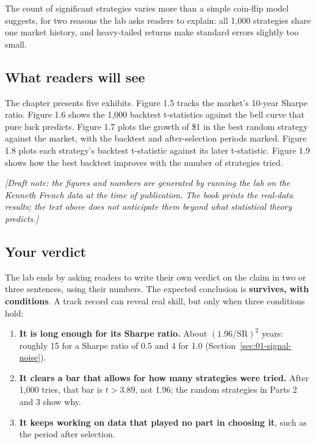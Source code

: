 The count of significant strategies varies more than a simple coin-flip model suggests, for two reasons the lab asks readers to explain: all 1,000 strategies share one market history, and heavy-tailed returns make standard errors slightly too small.

\subsection*{What readers will see}

The chapter presents five exhibits. Figure 1.5 tracks the market's 10-year Sharpe ratio. Figure 1.6 shows the 1,000 backtest t-statistics against the bell curve that pure luck predicts. Figure 1.7 plots the growth of \$1 in the best random strategy against the market, with the backtest and after-selection periods marked. Figure 1.8 plots each strategy's backtest t-statistic against its later t-statistic. Figure 1.9 shows how the best backtest improves with the number of strategies tried.

\emph{[Draft note: the figures and numbers are generated by running the lab on the Kenneth French data at the time of publication. The book prints the real-data results; the text above does not anticipate them beyond what statistical theory predicts.]}

\subsection*{Your verdict}

The lab ends by asking readers to write their own verdict on the claim in two or three sentences, using their numbers. The expected conclusion is \textbf{survives, with conditions}. A track record can reveal real skill, but only when three conditions hold:

\begin{enumerate}
  \item \textbf{It is long enough for its Sharpe ratio.} About $(1.96/\mathrm{SR})^2$ years: roughly 15 for a Sharpe ratio of 0.5 and 4 for 1.0 (Section~\ref{sec:01-signal-noise}).
  \item \textbf{It clears a bar that allows for how many strategies were tried.} After 1,000 tries, that bar is $t > 3.89$, not 1.96; the random strategies in Parts 2 and 3 show why.
  \item \textbf{It keeps working on data that played no part in choosing it}, such as the period after selection.
\end{enumerate}

